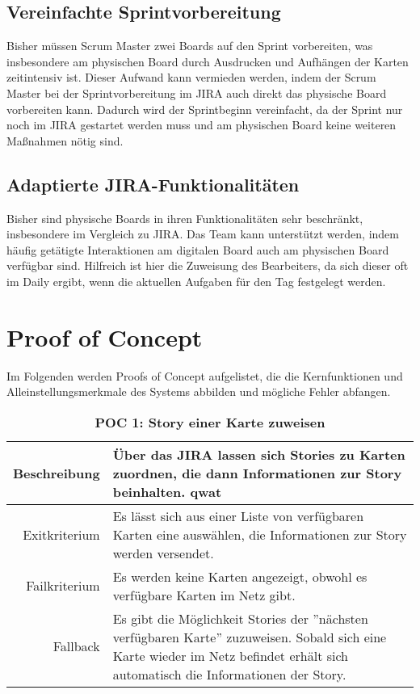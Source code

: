 \documentclass[12pt,titlepage]{scrartcl}
\begin{document}
		\subsection{Vereinfachte Sprintvorbereitung}
		Bisher müssen Scrum Master zwei Boards auf den Sprint vorbereiten, was insbesondere am physischen Board durch Ausdrucken und Aufhängen der Karten zeitintensiv ist. Dieser Aufwand kann vermieden werden, indem der Scrum Master bei der Sprintvorbereitung im JIRA auch direkt das physische Board vorbereiten kann. Dadurch wird der Sprintbeginn vereinfacht, da der Sprint nur noch im JIRA gestartet werden muss und am physischen Board keine weiteren Maßnahmen nötig sind.
		\subsection{Adaptierte JIRA-Funktionalitäten}
		Bisher sind physische Boards in ihren Funktionalitäten sehr beschränkt, insbesondere im Vergleich zu JIRA. Das Team kann unterstützt werden, indem häufig getätigte Interaktionen am digitalen Board auch am physischen Board verfügbar sind. Hilfreich ist hier die Zuweisung des Bearbeiters, da sich dieser oft im Daily ergibt, wenn die aktuellen Aufgaben für den Tag festgelegt werden. 
	\newpage
	\section{Proof of Concept}
	Im Folgenden werden Proofs of Concept aufgelistet, die die Kernfunktionen und Alleinstellungsmerkmale des Systems abbilden und mögliche Fehler abfangen.

\begin{table}[H]
\centering
\caption{\textbf{POC 1: Story einer Karte zuweisen}}
\label{poc1}
\begin{tabularx}{\linewidth}{|r|X|}
\hline
Beschreibung  & Über das JIRA lassen sich Stories zu Karten zuordnen, die dann Informationen zur Story beinhalten. qwat                                  \\ \hline
Exitkriterium & Es lässt sich aus einer Liste von verfügbaren Karten eine auswählen, die Informationen zur Story werden versendet. \\ \hline
Failkriterium & Es werden keine Karten angezeigt, obwohl es verfügbare Karten im Netz gibt. \\ \hline
Fallback      & Es gibt die Möglichkeit Stories der ''nächsten verfügbaren Karte'' zuzuweisen. Sobald sich eine Karte wieder im Netz befindet erhält sich automatisch die Informationen der Story. \\ \hline
\end{tabularx}
\end{table}
\end{document}
